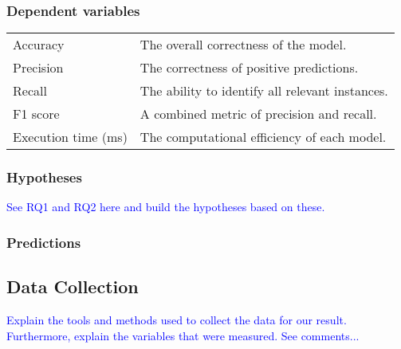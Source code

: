 \subsubsection{Dependent variables}
\begin{center}
    \begin{tabular}{| l | l |}
        Accuracy            & The overall correctness of the model.           \\
        Precision           & The correctness of positive predictions.        \\
        Recall              & The ability to identify all relevant instances. \\
        F1 score            & A combined metric of precision and recall.      \\
        Execution time (ms) & The computational efficiency of each model.     \\
    \end{tabular}
\end{center}

\subsubsection{Hypotheses}
\textcolor{blue}{See RQ1 and RQ2 here and build the hypotheses based on these.}

\subsubsection{Predictions}

\subsection{Data Collection}
%
%
\textcolor{blue}{Explain the tools and methods used to collect the data for our
result. Furthermore, explain the variables that were measured. See comments...}

